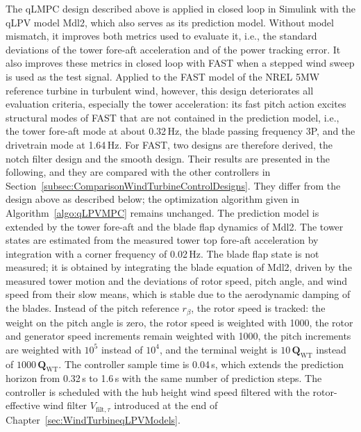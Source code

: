 The qLMPC design described above is applied in closed loop in Simulink with the qLPV model Mdl2, which also serves as its prediction model. Without model mismatch, it improves both metrics used to evaluate it, i.e., the standard deviations of the tower fore-aft acceleration and of the power tracking error. It also improves these metrics in closed loop with FAST when a stepped wind sweep is used as the test signal. Applied to the FAST model of the NREL 5MW reference turbine in turbulent wind, however, this design deteriorates all evaluation criteria, especially the tower acceleration: its fast pitch action excites structural modes of FAST that are not contained in the prediction model, i.e., the tower fore-aft mode at about 0.32\,Hz, the blade passing frequency 3P, and the drivetrain mode at 1.64\,Hz. For FAST, two designs are therefore derived, the notch filter design and the smooth design. Their results are presented in the following, and they are compared with the other controllers in Section~\ref{subsec:ComparisonWindTurbineControlDesigns}. They differ from the design above as described below; the optimization algorithm given in Algorithm~\ref{algo:qLPVMPC} remains unchanged.
The prediction model is extended by the tower fore-aft and the blade flap dynamics of Mdl2. The tower states are estimated from the measured tower top fore-aft acceleration by integration with a corner frequency of 0.02\,Hz. The blade flap state is not measured; it is obtained by integrating the blade equation of Mdl2, driven by the measured tower motion and the deviations of rotor speed, pitch angle, and wind speed from their slow means, which is stable due to the aerodynamic damping of the blades. Instead of the pitch reference $r_\beta$, the rotor speed is tracked: the weight on the pitch angle is zero, the rotor speed is weighted with 1000, the rotor and generator speed increments remain weighted with 1000, the pitch increments are weighted with $10^5$ instead of $10^4$, and the terminal weight is $10\,\bm{Q}_{\text{WT}}$ instead of $1000\,\bm{Q}_{\text{WT}}$.
%
%
The controller sample time is 0.04\,s, which extends the prediction horizon from 0.32\,s to 1.6\,s with the same number of prediction steps. The controller is scheduled with the hub height wind speed filtered with the rotor-effective wind filter $V_{\text{filt},\tau}$ introduced at the end of Chapter~\ref{sec:WindTurbineqLPVModels}.

